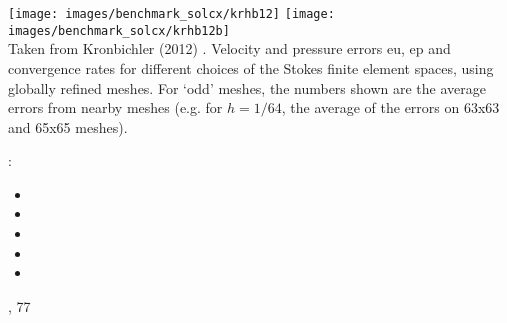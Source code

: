 \begin{center}
\texttt{[image: images/benchmark\_solcx/krhb12]}
\texttt{[image: images/benchmark\_solcx/krhb12b]}\\
{\captionfont Taken from Kronbichler \etal (2012) \cite{krhb12}.
Velocity and pressure errors eu, ep and convergence rates for different choices of 
the Stokes finite element spaces, using globally refined meshes. 
For `odd' meshes, the numbers shown are the average errors from nearby meshes 
(e.g. for $h=1/64$, the average of the errors on 63x63 and 65x65 meshes).}
\end{center}


\Literature: 
\begin{itemize}
\item {}
\item {}
\item {}
\item {}
\item {}
\end{itemize}

, 77



